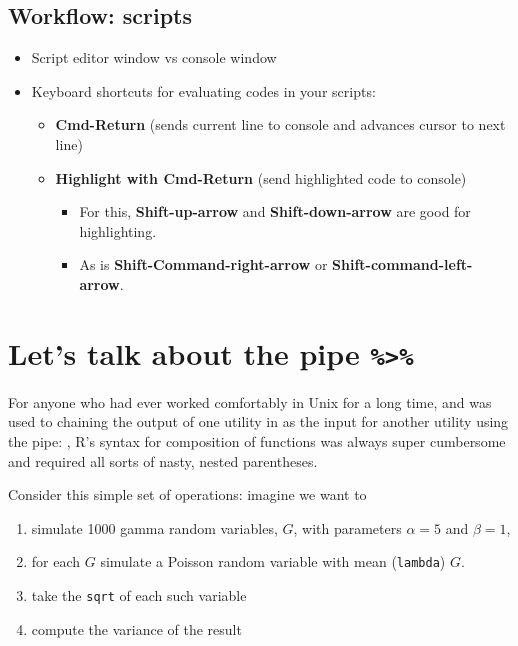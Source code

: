 \documentclass[]{book}
\providecommand{\tightlist}{%
  \setlength{\itemsep}{0pt}\setlength{\parskip}{0pt}}
\theoremstyle{definition}
\theoremstyle{definition}
\theoremstyle{remark}
\begin{document}
\subsection{Workflow: scripts}\label{workflow-scripts}

\begin{itemize}
\tightlist
\item
  Script editor window vs console window
\item
  Keyboard shortcuts for evaluating codes in your scripts:

  \begin{itemize}
  \tightlist
  \item
    \textbf{Cmd-Return} (sends current line to console and advances
    cursor to next line)
  \item
    \textbf{Highlight with Cmd-Return} (send highlighted code to
    console)

    \begin{itemize}
    \tightlist
    \item
      For this, \textbf{Shift-up-arrow} and \textbf{Shift-down-arrow}
      are good for highlighting.
    \item
      As is \textbf{Shift-Command-right-arrow} or
      \textbf{Shift-command-left-arrow}.
    \end{itemize}
  \end{itemize}
\end{itemize}

\section{\texorpdfstring{Let's talk about the pipe
\texttt{\%\textgreater{}\%}}{Let's talk about the pipe \%\textgreater{}\%}}\label{lets-talk-about-the-pipe}

For anyone who had ever worked comfortably in Unix for a long time, and
was used to chaining the output of one utility in as the input for
another utility using the pipe: \texttt{\textbar{}}, R's syntax for
composition of functions was always super cumbersome and required all
sorts of nasty, nested parentheses.

Consider this simple set of operations: imagine we want to

\begin{enumerate}
\def\labelenumi{\arabic{enumi}.}
\tightlist
\item
  simulate 1000 gamma random variables, \(G\), with parameters
  \(\alpha=5\) and \(\beta = 1\),
\item
  for each \(G\) simulate a Poisson random variable with mean
  (\texttt{lambda}) \(G\).
\item
  take the \texttt{sqrt} of each such variable
\item
  compute the variance of the result
\end{enumerate}
\end{document}
